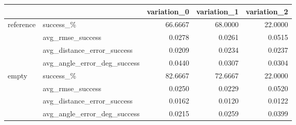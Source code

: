 \begin{tabular}{llrrr}
\toprule
 &  & variation_0 & variation_1 & variation_2 \\
\midrule

\multirow[t]{4}{*}{reference} & success_\% & 66.6667 & 68.0000 & 22.0000 \\
 & avg_rmse_success & 0.0278 & 0.0261 & 0.0515 \\
 & avg_distance_error_success & 0.0209 & 0.0234 & 0.0237 \\
 & avg_angle_error_deg_success & 0.0440 & 0.0307 & 0.0304 \\
\cline{1-5}
\multirow[t]{4}{*}{empty} & success_\% & 82.6667 & 72.6667 & 22.0000 \\
 & avg_rmse_success & 0.0250 & 0.0229 & 0.0520 \\
 & avg_distance_error_success & 0.0162 & 0.0120 & 0.0122 \\
 & avg_angle_error_deg_success & 0.0215 & 0.0259 & 0.0399 \\
\cline{1-5}
\bottomrule
\end{tabular}
